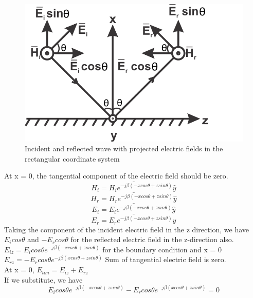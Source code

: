 \begin{figure}[h]
\centering
\includegraphics[scale=1]{./graphics/silas2}
\caption{Incident and reflected wave with projected electric fields in the rectangular coordinate system}
\label{fig:silas2}
\end{figure}
At x = 0, the tangential component of the electric field should be zero.
\begin{equation*}
\bar{H_{i} = H_{i} e^{-j\beta(-xcos\theta + zsin\theta)} \hat{y}}
\end{equation*}
\begin{equation*}
\bar{H_{r} = H_{r} e^{-j\beta(-xcos\theta + zsin\theta)} \hat{y}}
\end{equation*}
\begin{equation*}
\bar{E_{i} = E_{i} e^{-j\beta(-xcos\theta + zsin\theta)} \hat{y}}
\end{equation*}
\begin{equation*}
\bar{E_{r} = E_{r} e^{-j\beta(-xcos\theta + zsin\theta)} \hat{y}}
\end{equation*}
Taking the component of the incident electric field in the z direction, we have $E_{i} cos\theta$ and $-E_{r}cos\theta$ for the reflected electric field in the z-direction also.\\
$E_{iz} = E_{i}cos\theta e^{-j\beta(-xcos\theta + zsin\theta)}$	for the boundary condition and x = 0\\
$E_{rz} = -E_{r}cos\theta e^{-j\beta(xcos\theta + zsin\theta)}$   Sum of tangential electric field is zero.\\
At x = 0, $E_{ton} = E_{iz} + E_{rz}$\\
If we substitute, we have\\
\begin{equation*}
E_{i}cos\theta e^{-j\beta(-xcos\theta + zsin\theta)} - E_{r}cos\theta e^{-j\beta(xcos\theta + zsin\theta)} = 0
\end{equation*}

